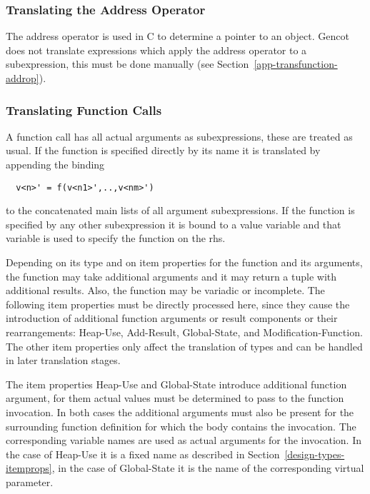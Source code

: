\subsubsection{Translating the Address Operator}

The address operator \code{\&} is used in C to determine a pointer to an object. Gencot does not translate expressions which
apply the address operator to a subexpression, this must be done manually (see Section~\ref{app-transfunction-addrop}).

\subsubsection{Translating Function Calls}

A function call has all actual arguments as subexpressions, these are treated as usual. If the function is specified directly 
by its name  it is translated by appending the binding
\begin{verbatim}
  v<n>' = f(v<n1>',..,v<nm>')
\end{verbatim}
to the concatenated main lists of all argument subexpressions. If the function is specified by any other subexpression it is
bound to a value variable and that variable is used to specify the function on the rhs.

Depending on its type and on item properties for the function and its arguments, the function may take additional arguments and
it may return a tuple with additional results. Also, the function may be variadic or incomplete. The following item properties
must be directly processed here, since they cause the introduction of additional function arguments or result components or 
their rearrangements: Heap-Use, Add-Result, Global-State, and Modification-Function. The other item properties only affect 
the translation of types and can be handled in later translation stages.

The item properties Heap-Use and Global-State introduce additional function argument, for them actual values must be determined
to pass to the function invocation. In both cases the additional arguments must also be present for the surrounding function
definition for which the body contains the invocation. The corresponding variable names are used as actual arguments for the
invocation. In the case of Heap-Use it is a fixed name as described in Section~\ref{design-types-itemprops}, in the case of
Global-State it is the name of the corresponding virtual parameter.

